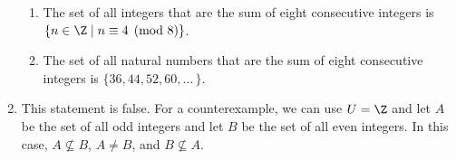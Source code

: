 \begin{enumerate}
\begin{enumerate}
\item The set of all integers that are the sum of eight consecutive integers is 
$\left\{ n \in \Z \mid n \equiv 4 \pmod 8 \right\}$.

\item The set of all natural numbers that are the sum of eight consecutive integers is 
$\{36, 44, 52, 60, \ldots \, \}$.
\end{enumerate}


\item This statement is false.  For a counterexample, we can use $U = \Z$ and let $A$ be the set of all odd integers and let $B$ be the set of all even integers.  In this case, 
$A \not\subseteq B$, $A \ne B$, and $B \not\subseteq A$.
\end{enumerate}




